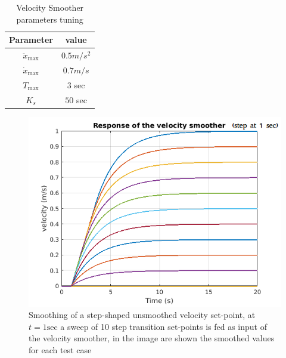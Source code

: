 \begin{table}[h]
	\begin{center}
		\begin{tabular}{|c|c|}
			\hline
			Parameter & value\\
			\hline
			$\ddot{x}_{\text{max}}$  & $0.5m/s^2$\\
			\hline
			$\dot{x}_{\text{max}}$  & $0.7m/s$\\
			\hline
			$T_{\text{max}}$  & $3$ sec\\
			\hline
			$K_s$  & $50$ sec\\
			\hline
		\end{tabular}
	\end{center}
	\caption{Velocity Smoother parameters tuning}
	\label{parsmoother}
\end{table}

\begin{figure}[h]
	\centering
	\includegraphics[width=0.8\columnwidth]{images/03-foundation/controlsweep}
	\caption{Smoothing of a step-shaped unsmoothed velocity set-point, at $t=1\text{sec}$ a sweep of 10 step transition set-points is fed as input of the velocity smoother, in the image are shown the smoothed values for each test case} 
	\label{controlsweep}
\end{figure}

